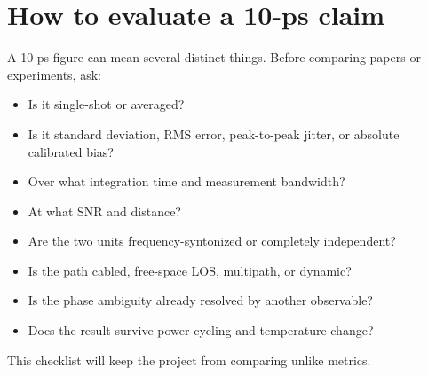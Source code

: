 \documentclass[11pt]{article}
\begin{document}
\section{How to evaluate a 10-ps claim}
A 10-ps figure can mean several distinct things. Before comparing papers or experiments, ask:
\begin{itemize}
\item Is it single-shot or averaged?
\item Is it standard deviation, RMS error, peak-to-peak jitter, or absolute calibrated bias?
\item Over what integration time and measurement bandwidth?
\item At what SNR and distance?
\item Are the two units frequency-syntonized or completely independent?
\item Is the path cabled, free-space LOS, multipath, or dynamic?
\item Is the phase ambiguity already resolved by another observable?
\item Does the result survive power cycling and temperature change?
\end{itemize}
This checklist will keep the project from comparing unlike metrics.
\end{document}

